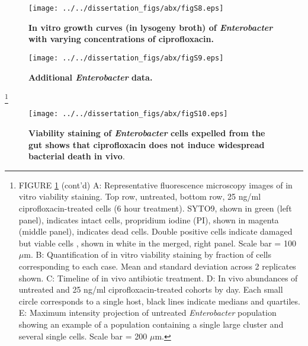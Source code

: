 {{{{\begin{figure}[H]
	\centerline{
		\texttt{[image: ../../dissertation\_figs/abx/figS8.eps]}} 
	\caption{\textbf{In vitro growth curves (in lysogeny broth) of \textit{Enterobacter} with varying concentrations of ciprofloxacin.}}
\end{figure}


\begin{figure}[H]
	\centerline{
		\texttt{[image: ../../dissertation\_figs/abx/figS9.eps]}}
	\caption{\textbf{Additional \textit{Enterobacter} data.}} 
	\label{fig:figS9}
\end{figure}

{\let\thefootnote\relax\footnote{FIGURE \ref{fig:figS9} (cont'd) A: Representative fluorescence microscopy images of in vitro viability staining. Top row, untreated, bottom row, 25 ng/ml ciprofloxacin-treated cells (6 hour treatment). SYTO9, shown in green (left panel), indicates intact cells, propridium iodine (PI), shown in magenta (middle panel), indicates dead cells. Double positive cells indicate damaged but viable cells \cite{ben2005genetic}, shown in white in the merged, right panel. Scale bar = 100 $\mu$m. B: Quantification of in vitro viability staining by fraction of cells corresponding to each case. Mean and standard deviation across 2 replicates shown. C: Timeline of in vivo antibiotic treatment. D: In vivo abundances of untreated and 25 ng/ml ciprofloxacin-treated cohorts by day. Each small circle corresponds to a single host, black lines indicate medians and quartiles. E: Maximum intensity projection of untreated \textit{Enterobacter} population showing an example of a population containing a single large cluster and several single cells. Scale bar = 200 $\mu$m.}


\begin{figure}[H]
	\centerline{
		\texttt{[image: ../../dissertation\_figs/abx/figS10.eps]}} 
	\caption{\textbf{Viability staining of \textit{Enterobacter} cells expelled from the gut shows that ciprofloxacin does not induce widespread bacterial death in vivo}.}
	\label{fig:figS10}
\end{figure}

}}}}}
